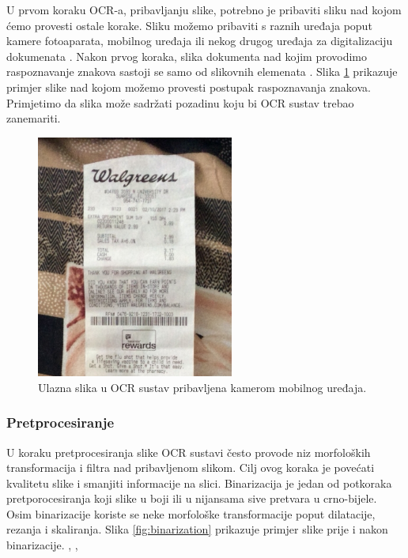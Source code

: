 \documentclass[times, utf8, zavrsni]{fer}
\begin{document}
U prvom koraku OCR-a, pribavljanju slike, potrebno je pribaviti sliku nad kojom ćemo
provesti ostale korake. Sliku možemo pribaviti s raznih uređaja poput kamere fotoaparata,
mobilnog uređaja ili nekog drugog uređaja za digitalizaciju dokumenata .
Nakon prvog koraka, slika dokumenta nad kojim provodimo raspoznavanje znakova sastoji se
samo od slikovnih elemenata  \citep{Vynckier:2018:HowOcrWorks}.
Slika \ref{fig:receipt-example-02} prikazuje primjer slike nad kojom možemo provesti
postupak raspoznavanja znakova. Primjetimo da slika može sadržati pozadinu koju bi
OCR sustav trebao zanemariti.

\begin{figure}[htb]
    \centering
    \includegraphics[height=8cm]{images/receipt-example-02.jpeg}
    \caption{Ulazna slika u OCR sustav pribavljena kamerom mobilnog uređaja.}
    \label{fig:receipt-example-02}
\end{figure}

\subsubsection{Pretprocesiranje}

U koraku pretprocesiranja slike OCR sustavi često provode niz morfoloških transformacija i filtra nad pribavljenom slikom.
Cilj ovog koraka je povećati kvalitetu slike i smanjiti informacije na slici. Binarizacija je jedan od
potkoraka pretporocesiranja koji slike u boji ili u nijansama sive pretvara u crno-bijele. Osim binarizacije
koriste se neke morfološke transformacije poput dilatacije, rezanja i skaliranja.
Slika \ref{fig:binarization} prikazuje primjer slike prije i nakon binarizacije. \citep{Gulan:2016:Bacherlor},
\citep{DBLP:journals/corr/abs-1710-05703}, \citep{Jurin:2017:Master}
\end{document}
